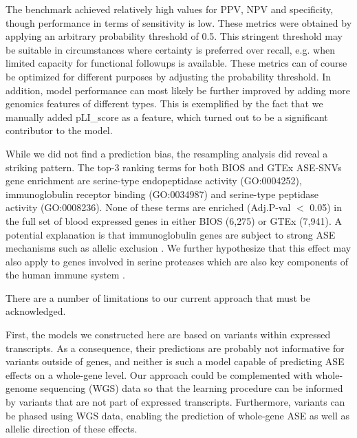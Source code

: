 \documentclass{book}
\begin{document}
\begin{refsection}

The benchmark achieved relatively high values for PPV, NPV and specificity, though performance in terms of sensitivity is low.
These metrics were obtained by applying an arbitrary probability threshold of 0.5.
This stringent threshold may be suitable in circumstances where certainty is preferred over recall, e.g. when limited capacity for functional followups is available.
These metrics can of course be optimized for different purposes by adjusting the probability threshold.
In addition, model performance can most likely be further improved by adding more genomics features of different types.
This is exemplified by the fact that we manually added pLI\_score as a feature, which turned out to be a significant contributor to the model.

While we did not find a prediction bias, the resampling analysis did reveal a striking pattern.
The top-3 ranking terms for both BIOS and GTEx ASE-SNVs gene enrichment are serine-type endopeptidase activity (GO:0004252), immunoglobulin receptor binding (GO:0034987) and serine-type peptidase activity (GO:0008236).
None of these terms are enriched (Adj.P-val $<$ 0.05) in the full set of blood expressed genes in either BIOS (6,275) or GTEx (7,941).
A potential explanation is that immunoglobulin genes are subject to strong ASE mechanisms such as allelic exclusion \cite{Brady2010Antigen,Vettermann2010Allelic}.
We further hypothesize that this effect may also apply to genes involved in serine proteases which are also key components of the human immune system \cite{Patel2017A,Bestle2020TMPRSS2}.

There are a number of limitations to our current approach that must be acknowledged.

First, the models we constructed here are based on variants within expressed transcripts.
As a consequence, their predictions are probably not informative for variants outside of genes, and neither is such a model capable of predicting ASE effects on a whole-gene level.
Our approach could be complemented with whole-genome sequencing (WGS) data so that the learning procedure can be informed by variants that are not part of expressed transcripts.
Furthermore, variants can be phased using WGS data, enabling the prediction of whole-gene ASE as well as allelic direction of these effects.


\end{refsection}
\end{document}
